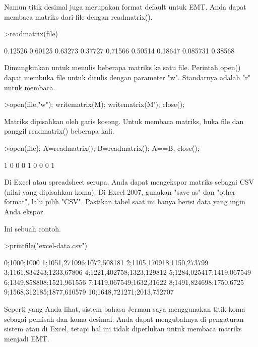 \documentclass[a4paper,10pt]{article}
\begin{document}
\begin{eulernotebook}
\begin{eulercomment}
\begin{eulercomment}
\begin{eulercomment}
\begin{eulercomment}
\begin{eulercomment}
\begin{eulercomment}
\begin{eulercomment}
\begin{eulercomment}
\begin{eulercomment}
Namun titik desimal juga merupakan format default untuk EMT. Anda
dapat membaca matriks dari file dengan readmatrix().
\end{eulercomment}
\begin{eulerprompt}
>readmatrix(file)
\end{eulerprompt}
\begin{euleroutput}
    0.12526   0.60125   0.63273 
    0.37727   0.71566   0.50514 
    0.18647  0.085731   0.38568 
\end{euleroutput}
\begin{eulercomment}
Dimungkinkan untuk menulis beberapa matriks ke satu file. Perintah
open() dapat membuka file untuk ditulis dengan parameter "w".
Standarnya adalah "r" untuk membaca.
\end{eulercomment}
\begin{eulerprompt}
>open(file,"w"); writematrix(M); writematrix(M'); close();
\end{eulerprompt}
\begin{eulercomment}
Matriks dipisahkan oleh garis kosong. Untuk membaca matriks, buka file
dan panggil readmatrix() beberapa kali.
\end{eulercomment}
\begin{eulerprompt}
>open(file); A=readmatrix(); B=readmatrix(); A==B, close();
\end{eulerprompt}
\begin{euleroutput}
          1         0         0 
          0         1         0 
          0         0         1 
\end{euleroutput}
\begin{eulercomment}
Di Excel atau spreadsheet serupa, Anda dapat mengekspor matriks
sebagai CSV (nilai yang dipisahkan koma). Di Excel 2007, gunakan "save
as" dan "other format", lalu pilih "CSV". Pastikan tabel saat ini
hanya berisi data yang ingin Anda ekspor.

Ini sebuah contoh.
\end{eulercomment}
\begin{eulerprompt}
>printfile("excel-data.csv")
\end{eulerprompt}
\begin{euleroutput}
  0;1000;1000
  1;1051,271096;1072,508181
  2;1105,170918;1150,273799
  3;1161,834243;1233,67806
  4;1221,402758;1323,129812
  5;1284,025417;1419,067549
  6;1349,858808;1521,961556
  7;1419,067549;1632,31622
  8;1491,824698;1750,6725
  9;1568,312185;1877,610579
  10;1648,721271;2013,752707
\end{euleroutput}
\begin{eulercomment}
Seperti yang Anda lihat, sistem bahasa Jerman saya menggunakan titik
koma sebagai pemisah dan koma desimal. Anda dapat mengubahnya di
pengaturan sistem atau di Excel, tetapi hal ini tidak diperlukan untuk
membaca matriks menjadi EMT.


\end{eulercomment}
\end{eulercomment}
\end{eulercomment}
\end{eulercomment}
\end{eulercomment}
\end{eulercomment}
\end{eulercomment}
\end{eulercomment}
\end{eulercomment}
\end{eulernotebook}
\end{document}
